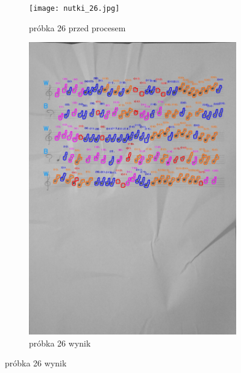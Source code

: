 \documentclass[11pt]{article}
\begin{document}
\begin{figure}[H]
    \centering
    \begin{subfigure}[b]{0.475\textwidth}
        \centering
        \graphicspath{ {Resources/} }
        \texttt{[image: nutki\_26.jpg]}
        \caption[]%
        {{\small próbka 26 przed procesem}}
        \label{fig:sub1}
    \end{subfigure}
    \hfill
    \begin{subfigure}[b]{0.475\textwidth}
        \centering
        \graphicspath{ {blobs/} }
        \includegraphics[width=\textwidth]{26_cnts.jpg}
        \caption[]%
        {{\small próbka 26 wynik}}
        \label{fig:sub2}
    \end{subfigure}
\end{figure}
\end{document}
